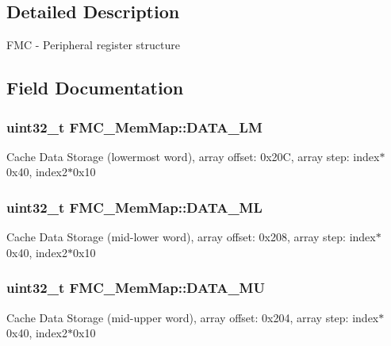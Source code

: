 \subsection{Detailed Description}
F\+M\+C -\/ Peripheral register structure 

\subsection{Field Documentation}
\hypertarget{struct_f_m_c___mem_map_ad622198b50458bc09f401b83f5743e33}{}
\subsubsection[{D\+A\+T\+A\+\_\+\+L\+M}]{\setlength{\rightskip}{0pt plus 5cm}uint32\+\_\+t F\+M\+C\+\_\+\+Mem\+Map\+::\+D\+A\+T\+A\+\_\+\+L\+M}\label{struct_f_m_c___mem_map_ad622198b50458bc09f401b83f5743e33}
Cache Data Storage (lowermost word), array offset\+: 0x20\+C, array step\+: index$\ast$0x40, index2$\ast$0x10 \hypertarget{struct_f_m_c___mem_map_aa9e41db6fcfefe83fb92326832bb0eb1}{}
\subsubsection[{D\+A\+T\+A\+\_\+\+M\+L}]{\setlength{\rightskip}{0pt plus 5cm}uint32\+\_\+t F\+M\+C\+\_\+\+Mem\+Map\+::\+D\+A\+T\+A\+\_\+\+M\+L}\label{struct_f_m_c___mem_map_aa9e41db6fcfefe83fb92326832bb0eb1}
Cache Data Storage (mid-\/lower word), array offset\+: 0x208, array step\+: index$\ast$0x40, index2$\ast$0x10 \hypertarget{struct_f_m_c___mem_map_a630fe34adeaf842dd4305530458005ba}{}
\subsubsection[{D\+A\+T\+A\+\_\+\+M\+U}]{\setlength{\rightskip}{0pt plus 5cm}uint32\+\_\+t F\+M\+C\+\_\+\+Mem\+Map\+::\+D\+A\+T\+A\+\_\+\+M\+U}\label{struct_f_m_c___mem_map_a630fe34adeaf842dd4305530458005ba}
Cache Data Storage (mid-\/upper word), array offset\+: 0x204, array step\+: index$\ast$0x40, index2$\ast$0x10 \hypertarget{struct_f_m_c___mem_map_ace662efebef446fe55b97873fc6e364a}{}

